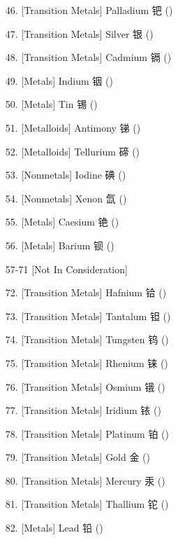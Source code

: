 \begin{itemize}
\begin{itemize}
        \item[46.]      [Transition Metals]     Palladium       钯  ()
        \item[47.]      [Transition Metals]     Silver          银  ()
        \item[48.]      [Transition Metals]     Cadmium         镉  ()
        \item[49.]      [Metals]                Indium          铟  ()
        \item[50.]      [Metals]                Tin             锡  ()
        \item[51.]      [Metalloids]            Antimony        锑  ()
        \item[52.]      [Metalloids]            Tellurium       碲  ()
        \item[53.]      [Nonmetals]             Iodine          碘  ()
        \item[54.]      [Nonmetals]             Xenon           氙  ()
        \item[55.]      [Metals]                Caesium         铯  ()
        \item[56.]      [Metals]                Barium          钡  ()
        \item[57-71]    [Not In Consideration]
        \item[72.]      [Transition Metals]     Hafnium         铪  ()
        \item[73.]      [Transition Metals]     Tantalum        钽  ()
        \item[74.]      [Transition Metals]     Tungsten        钨  ()
        \item[75.]      [Transition Metals]     Rhenium         铼  ()
        \item[76.]      [Transition Metals]     Osmium          锇  ()
        \item[77.]      [Transition Metals]     Iridium         铱  ()
        \item[78.]      [Transition Metals]     Platinum        铂  ()
        \item[79.]      [Transition Metals]     Gold            金  ()
        \item[80.]      [Transition Metals]     Mercury         汞  ()
        \item[81.]      [Transition Metals]     Thallium        铊  ()
        \item[82.]      [Metals]                Lead            铅  ()

\end{itemize}
\end{itemize}
